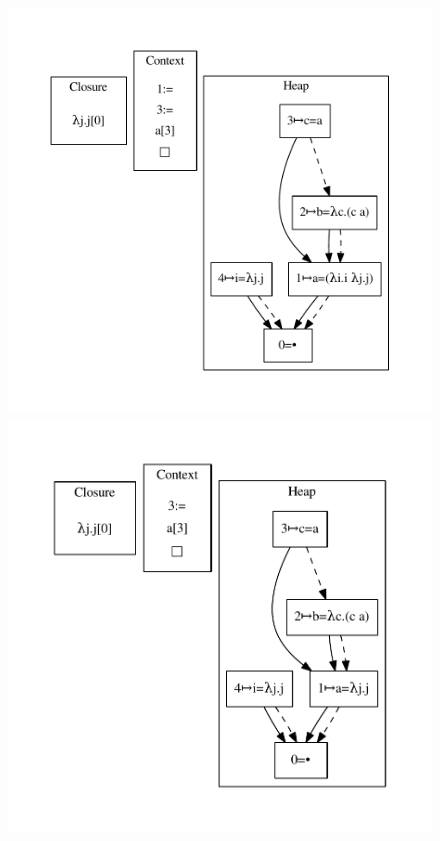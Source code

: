 \begin{figure}
\includegraphics[width=\linewidth/3]{figures/16.pdf}
\includegraphics[width=\linewidth/3]{figures/17.pdf}

\end{figure}
